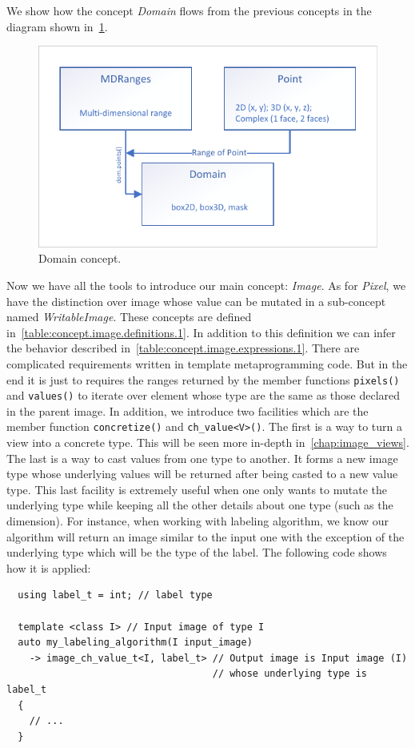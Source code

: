 We show how the concept \emph{Domain} flows from the previous concepts in the diagram shown in~\cref{fig:concept.domain}.

\begin{figure}[htbp]
  \centering
  \includegraphics[width=.8\linewidth]{figs/concepts/domain.pdf}
  \caption{Domain concept.}
  \label{fig:concept.domain}
\end{figure}

Now we have all the tools to introduce our main concept: \emph{Image}. As for \emph{Pixel}, we have the distinction over
image whose value can be mutated in a sub-concept named \emph{WritableImage}. These concepts are defined
in~\cref{table:concept.image.definitions.1}. In addition to this definition we can infer the behavior described
in~\cref{table:concept.image.expressions.1}. There are complicated requirements written in template metaprogramming
code. But in the end it is just to requires the ranges returned by the member functions \texttt{pixels()} and
\texttt{values()} to iterate over element whose type are the same as those declared in the parent image. In addition, we
introduce two facilities which are the member function \texttt{concretize()} and \texttt{ch\_value<V>()}. The first is a
way to turn a view into a concrete type. This will be seen more in-depth in~\cref{chap:image_views}. The last is a way
to cast values from one type to another. It forms a new image type whose underlying values will be returned after being
casted to a new value type. This last facility is extremely useful when one only wants to mutate the underlying type
while keeping all the other details about one type (such as the dimension). For instance, when working with labeling
algorithm, we know our algorithm will return an image similar to the input one with the exception of the underlying type
which will be the type of the label. The following code shows how it is applied:
\begin{verbatim}
  using label_t = int; // label type

  template <class I> // Input image of type I
  auto my_labeling_algorithm(I input_image)
    -> image_ch_value_t<I, label_t> // Output image is Input image (I)
                                    // whose underlying type is label_t
  {
    // ...
  }
\end{verbatim}

